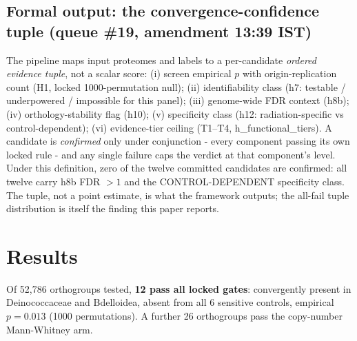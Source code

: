 \documentclass[12pt,a4paper]{article}
\begin{document}
\subsection{Formal output: the convergence-confidence tuple (queue \#19, amendment 13:39 IST)}
The pipeline maps input proteomes and labels to a per-candidate \emph{ordered evidence tuple}, not a scalar score: (i) screen empirical $p$ with origin-replication count (H1, locked 1000-permutation null); (ii) identifiability class (h7: testable / underpowered / impossible for this panel); (iii) genome-wide FDR context (h8b); (iv) orthology-stability flag (h10); (v) specificity class (h12: radiation-specific vs control-dependent); (vi) evidence-tier ceiling (T1--T4, h\_functional\_tiers). A candidate is \emph{confirmed} only under conjunction - every component passing its own locked rule - and any single failure caps the verdict at that component's level. Under this definition, zero of the twelve committed candidates are confirmed: all twelve carry h8b FDR $>1$ and the CONTROL-DEPENDENT specificity class. The tuple, not a point estimate, is what the framework outputs; the all-fail tuple distribution is itself the finding this paper reports.

\section{Results}
Of 52,786 orthogroups tested, \textbf{12 pass all locked gates}: convergently present in Deinococcaceae and Bdelloidea, absent from all 6 sensitive controls, empirical $p=0.013$ (1000 permutations). A further 26 orthogroups pass the copy-number Mann-Whitney arm.
\end{document}
